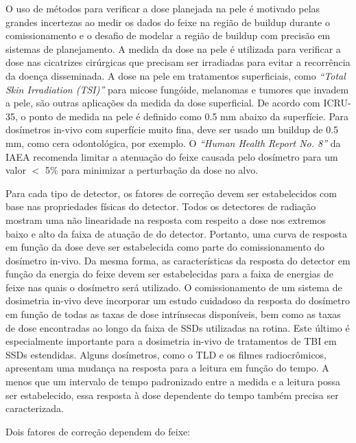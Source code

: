 \documentclass[11pt,a4paper]{article}
\newcounter{exemplo}
\begin{document}
	O uso de métodos para verificar a dose planejada na pele é motivado pelas grandes incertezas ao medir os dados do feixe na região de buildup durante o comissionamento e o desafio de modelar a região de buildup com precisão em sistemas de planejamento. A medida da dose na pele é utilizada para verificar a dose nas cicatrizes cirúrgicas que precisam ser irradiadas para evitar a recorrência da doença disseminada. A dose na pele em tratamentos superficiais, como \textit{``Total Skin Irradiation (TSI)''} para micose fungóide, melanomas e tumores que invadem a pele, são outras aplicações da medida da dose superficial. De acordo com ICRU-35, o ponto de medida na pele é definido como 0.5 mm abaixo da superfície. Para dosímetros in-vivo com superfície muito fina, deve ser usado um buildup de 0.5 mm, como cera odontológica, por exemplo. O \textit{``Human Health Report No. 8''} da IAEA recomenda limitar a atenuação do feixe causada pelo dosímetro para um valor $<$ 5\% para minimizar a perturbação da dose no alvo.

	Para cada tipo de detector, os fatores de correção devem ser estabelecidos com base nas propriedades físicas do detector. Todos os detectores de radiação mostram uma não linearidade na resposta com respeito a dose nos extremos baixo e alto da faixa de atuação de do detector. Portanto, uma curva de resposta em função da dose deve ser estabelecida como parte do comissionamento do dosímetro in-vivo. Da mesma forma, as características da resposta do detector em função da energia do feixe devem ser estabelecidas para a faixa de energias de feixe nas quais o dosímetro será utilizado. O comissionamento de um sistema de dosimetria in-vivo deve incorporar um estudo cuidadoso da resposta do dosímetro em função de todas as taxas de dose intrínsecas disponíveis, bem como as taxas de dose encontradas ao longo da faixa de SSDs utilizadas na rotina. Este último é especialmente importante para a dosimetria in-vivo de tratamentos de TBI em SSDs estendidas. Alguns dosímetros, como o TLD e os filmes radiocrômicos, apresentam uma mudança na resposta para a leitura em função do tempo. A menos que um intervalo de tempo padronizado entre a medida e a leitura possa ser estabelecido, essa resposta à dose dependente do tempo também precisa ser caracterizada.

	Dois fatores de correção dependem do feixe:
\end{document}
